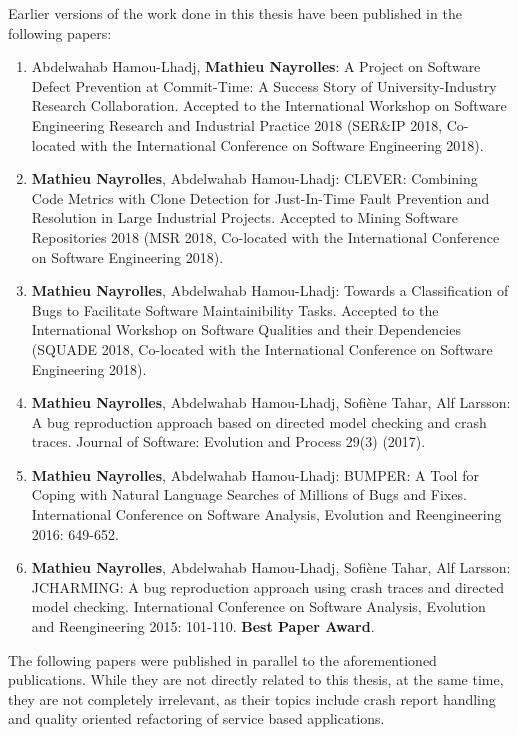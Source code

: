 \documentclass[12pt]{report}
\begin{document}
Earlier versions of the work done in this thesis have been published in
the following papers:

\begin{enumerate}
\def\labelenumi{\arabic{enumi}.}
\item
  Abdelwahab Hamou-Lhadj, \textbf{Mathieu Nayrolles}: A Project on
  Software Defect Prevention at Commit-Time: A Success Story of
  University-Industry Research Collaboration. Accepted to the
  International Workshop on Software Engineering Research and Industrial
  Practice 2018 (SER\&IP 2018, Co-located with the International
  Conference on Software Engineering 2018).
\item
  \textbf{Mathieu Nayrolles}, Abdelwahab Hamou-Lhadj: CLEVER: Combining
  Code Metrics with Clone Detection for Just-In-Time Fault Prevention
  and Resolution in Large Industrial Projects. Accepted to Mining
  Software Repositories 2018 (MSR 2018, Co-located with the
  International Conference on Software Engineering 2018).
\item
  \textbf{Mathieu Nayrolles}, Abdelwahab Hamou-Lhadj: Towards a
  Classification of Bugs to Facilitate Software Maintainibility Tasks.
  Accepted to the International Workshop on Software Qualities and their
  Dependencies (SQUADE 2018, Co-located with the International
  Conference on Software Engineering 2018).
\item
  \textbf{Mathieu Nayrolles}, Abdelwahab Hamou-Lhadj, Sofiène Tahar, Alf
  Larsson: A bug reproduction approach based on directed model checking
  and crash traces. Journal of Software: Evolution and Process 29(3)
  (2017).
\item
  \textbf{Mathieu Nayrolles}, Abdelwahab Hamou-Lhadj: BUMPER: A Tool for
  Coping with Natural Language Searches of Millions of Bugs and Fixes.
  International Conference on Software Analysis, Evolution and
  Reengineering 2016: 649-652.
\item
  \textbf{Mathieu Nayrolles}, Abdelwahab Hamou-Lhadj, Sofiène Tahar, Alf
  Larsson: JCHARMING: A bug reproduction approach using crash traces and
  directed model checking. International Conference on Software
  Analysis, Evolution and Reengineering 2015: 101-110. \textbf{Best
  Paper Award}.
\end{enumerate}

The following papers were published in parallel to the aforementioned
publications. While they are not directly related to this thesis, at the
same time, they are not completely irrelevant, as their topics include
crash report handling and quality oriented refactoring of service based
applications.
\end{document}
